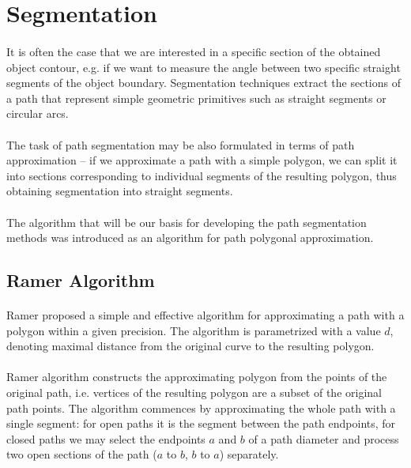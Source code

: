 \section{Segmentation}

\paragraph*{}
It is often the case that we are interested in a specific section of the obtained object contour, e.g. if we want to measure the angle between two specific straight segments of the object boundary. Segmentation techniques extract the sections of a path that represent simple geometric primitives such as straight segments or circular arcs.

\paragraph*{}
The task of path segmentation may be also formulated in terms of path approximation -- if we approximate a path with a simple polygon, we can split it into sections corresponding to individual segments of the resulting polygon, thus obtaining segmentation into straight segments.

\paragraph*{}
The algorithm that will be our basis for developing the path segmentation methods was introduced as an algorithm for path polygonal approximation.

\subsection{Ramer Algorithm}

\paragraph*{}
Ramer proposed\cite{Ramer72} a simple and effective algorithm for approximating a path with a polygon within a given precision. The algorithm is parametrized with a value $d$, denoting maximal distance from the original curve to the resulting polygon.

\paragraph*{}
Ramer algorithm constructs the approximating polygon from the points of the original path, i.e. vertices of the resulting polygon are a subset of the original path points. The algorithm commences by approximating the whole path with a single segment: for open paths it is the segment between the path endpoints, for closed paths we may select the endpoints $a$ and $b$ of a path diameter and process two open sections of the path ($a$ to $b$, $b$ to $a$) separately.


